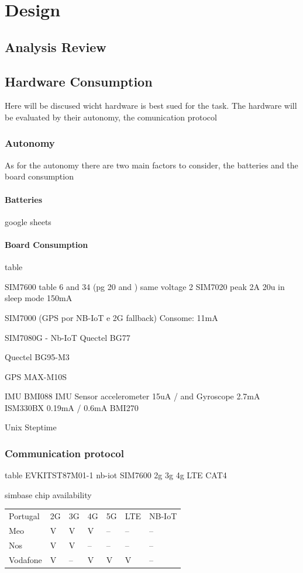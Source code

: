 
\chapter{Design}
\section{Analysis Review}



\section{Hardware Consumption}
Here will be discused wicht hardware is best sued for the task. The hardware will be evaluated by their
autonomy, the comunication protocol
\subsection{Autonomy}
As for the autonomy there are two main factors to consider, the batteries and the board consumption
\subsubsection{Batteries}
google sheets
\subsubsection{Board Consumption}



table

SIM7600 
table 6 and 34 (pg 20 and ) same voltage
2
SIM7020
peak 2A 20u in sleep mode 150mA

SIM7000 (GPS por NB-IoT e 2G fallback)
Consome: 11mA

SIM7080G - Nb-IoT
Quectel BG77

Quectel BG95-M3

 
GPS
MAX-M10S


IMU
BMI088 IMU Sensor
accelerometer 15uA  / and Gyroscope 2.7mA
ISM330BX
0.19mA / 0.6mA
BMI270


Unix Steptime

\subsection{Communication protocol}

table
EVKITST87M01-1 nb-iot
SIM7600 2g 3g 4g LTE CAT4

simbase chip availability

\begin{table}
    \centering
    \begin{tabular}{lllllll}
    Portugal & 2G & 3G & 4G & 5G & LTE & NB-IoT   \\
    Meo      & V  & V  & V  & -- & --  & --       \\
    Nos      & V  & V  & -- & -- & --  & --       \\
    Vodafone & V  & -- & V  & V  & V   & -- 
    \end{tabular}
\end{table}

